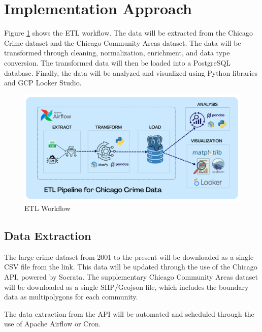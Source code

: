 \documentclass{article}
\begin{document}
\section{Implementation Approach}

Figure \ref{fig:workflow} shows the ETL workflow. The data will be extracted from the Chicago Crime dataset and the Chicago Community Areas dataset. The data will be transformed through cleaning, normalization, enrichment, and data type conversion. The transformed data will then be loaded into a PostgreSQL database. Finally, the data will be analyzed and visualized using Python libraries and GCP Looker Studio.
\begin{figure}[h]
    \centering
    \includegraphics[width=1\textwidth]{images/workflow.png}
    \caption{ETL Workflow}
    \label{fig:workflow}
\end{figure}

\subsection{Data Extraction}
The large crime dataset from 2001 to the present will be downloaded as a single CSV file from the link. This data will be updated through the use of the Chicago API, powered by Socrata. The supplementary Chicago Community Areas dataset will be downloaded as a single SHP/Geojson file, which includes the boundary data as multipolygons for each community. 

The data extraction from the API will be automated and scheduled through the use of Apache Airflow or Cron.
\end{document}
